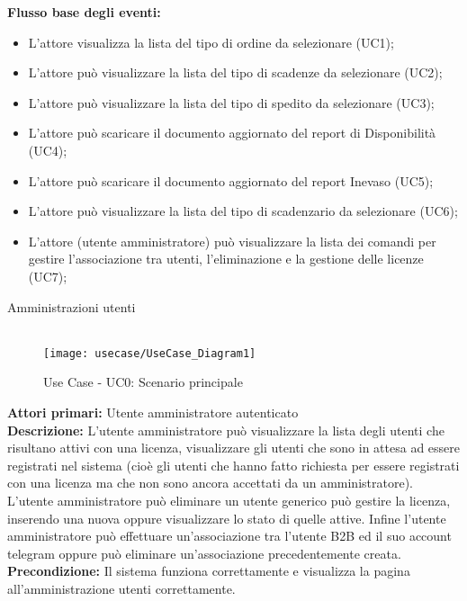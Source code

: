 \textbf{Flusso base degli eventi:}   
\begin{itemize}


\item L’attore visualizza la lista del tipo di ordine da selezionare (UC1);
\item L’attore può visualizzare la lista del tipo di scadenze da selezionare (UC2);
\item L’attore può visualizzare la lista del tipo di spedito da selezionare (UC3);
\item L’attore può scaricare il documento aggiornato  del report di Disponibilità (UC4);
\item L’attore può scaricare il documento aggiornato del report Inevaso (UC5);
\item L’attore può visualizzare la lista del tipo di scadenzario da selezionare (UC6);
\item L’attore (utente amministratore) può visualizzare la lista dei comandi per gestire l’associazione tra utenti, l’eliminazione e la gestione delle licenze (UC7);

\end{itemize}



Amministrazioni utenti \\\\

\begin{figure}[!h] 
    \centering 
    \texttt{[image: usecase/UseCase\_Diagram1]} 
    \caption{Use Case - UC0: Scenario principale}
\end{figure} 

\textbf{Attori primari:}   Utente amministratore autenticato\\


\textbf{Descrizione:} L’utente amministratore può visualizzare la lista degli utenti che risultano attivi con una licenza, visualizzare gli utenti che sono in attesa ad essere registrati nel sistema (cioè gli utenti che hanno fatto richiesta per essere registrati con una licenza ma che non sono ancora accettati da un amministratore). L’utente amministratore può eliminare un utente generico può gestire la licenza, inserendo una nuova oppure visualizzare lo stato di quelle attive. Infine l’utente amministratore può effettuare un’associazione tra l’utente B2B ed il suo account telegram oppure può eliminare un’associazione precedentemente creata. \\

\textbf{Precondizione:}   Il sistema funziona correttamente e visualizza la pagina all’amministrazione utenti correttamente. \\

